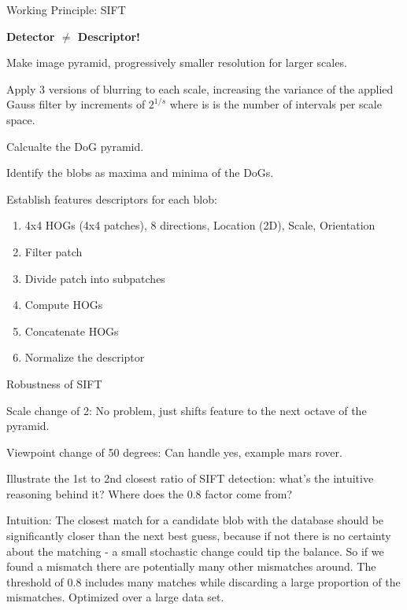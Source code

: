 \documentclass[10pt,a4paper]{scrartcl}
\begin{document}
\begin{multicols*}{2}
\begin{QandA}
{Working Principle: SIFT}
\item \textbf{Detector $\neq$ Descriptor!}
\item Make image pyramid, progressively smaller resolution for larger scales.
\item Apply 3 versions of blurring to each scale, increasing the variance of the applied Gauss filter by increments of $2^{1/s}$ where is is the number of intervals per scale space.
\item Calcualte the DoG pyramid.
\item Identify the blobs as maxima and minima of the DoGs.
\item Establish features descriptors for each blob:
\begin{enumerate}
\item 4x4 HOGs (4x4 patches), 8 directions, Location (2D), Scale, Orientation
\item Filter patch
\item Divide patch into subpatches
\item Compute HOGs
\item Concatenate HOGs
\item Normalize the descriptor
\end{enumerate}
\end{QandA}   

\begin{QandA}
{Robustness of SIFT}
\item Scale change of 2: No problem, just shifts feature to the next octave of the pyramid.
\item Viewpoint change of 50 degrees: Can handle yes, example mars rover.
\end{QandA} 

\begin{QandA}
{Illustrate the 1st to 2nd closest ratio of SIFT detection: what’s the intuitive
reasoning behind it? Where does the 0.8 factor come from?}
\item Intuition: The closest match for a candidate blob with the database should be significantly closer than the next best guess, because if not there is no certainty about the matching - a small stochastic change could tip the balance. So if we found a mismatch there are potentially many other mismatches around. The threshold of 0.8 includes many matches while discarding a large proportion of the mismatches. Optimized over a large data set.
\end{QandA}


\end{multicols*}
\end{document}
